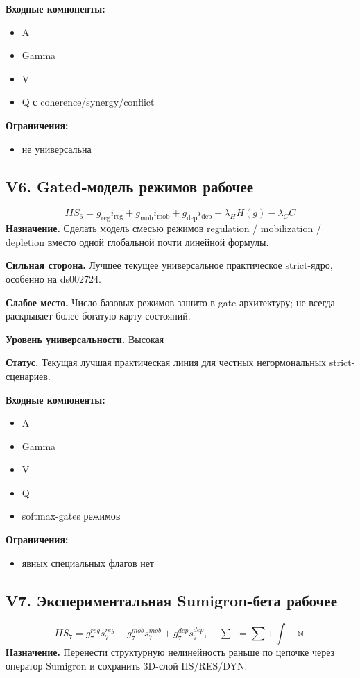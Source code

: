 \documentclass[11pt,a4paper]{article}
\newcommand{\sgop}{\mathop{\sum\!\!\!\int_{\bowtie}}}
\begin{document}
\textbf{Входные компоненты:}
\begin{itemize}[leftmargin=1.2cm]
\item A
\item Gamma
\item V
\item Q с coherence/synergy/conflict
\end{itemize}

\textbf{Ограничения:}
\begin{itemize}[leftmargin=1.2cm]
\item не универсальна
\end{itemize}


\subsection*{V6. Gated-модель режимов \textcolor{green!20!black}{\textbf{рабочее}}}
\[
IIS_6=g_{\mathrm{reg}}i_{\mathrm{reg}}+g_{\mathrm{mob}}i_{\mathrm{mob}}+g_{\mathrm{dep}}i_{\mathrm{dep}}-\lambda_H H(g)-\lambda_C C
\]
\textbf{Назначение.} Сделать модель смесью режимов regulation / mobilization / depletion вместо одной глобальной почти линейной формулы.

\textbf{Сильная сторона.} Лучшее текущее универсальное практическое strict-ядро, особенно на ds002724.

\textbf{Слабое место.} Число базовых режимов зашито в gate-архитектуру; не всегда раскрывает более богатую карту состояний.

\textbf{Уровень универсальности.} Высокая

\textbf{Статус.} Текущая лучшая практическая линия для честных негормональных strict-сценариев.

\textbf{Входные компоненты:}
\begin{itemize}[leftmargin=1.2cm]
\item A
\item Gamma
\item V
\item Q
\item softmax-gates режимов
\end{itemize}

\textbf{Ограничения:}
\begin{itemize}[leftmargin=1.2cm]
\item явных специальных флагов нет
\end{itemize}


\subsection*{V7. Экспериментальная Sumigron-бета \textcolor{green!20!black}{\textbf{рабочее}}}
\[
IIS_7=g^{reg}_7 s^{reg}_7 + g^{mob}_7 s^{mob}_7 + g^{dep}_7 s^{dep}_7,\quad \sgop=\sum+\int+\bowtie
\]
\textbf{Назначение.} Перенести структурную нелинейность раньше по цепочке через оператор Sumigron и сохранить 3D-слой IIS/RES/DYN.
\end{document}
